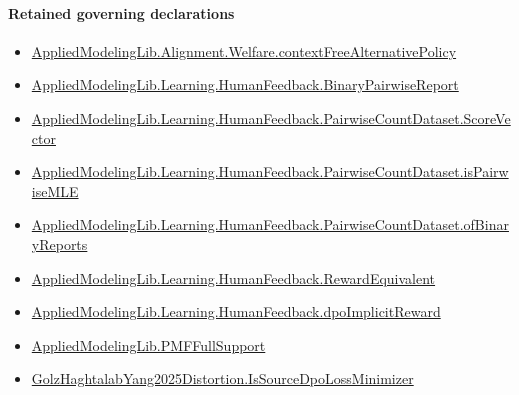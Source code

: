 \documentclass[10pt]{article}
\begin{document}
\paragraph{Retained governing declarations}
\begin{itemize}\raggedright
\item \hyperlink{governing-declaration-b7cf9e04e23161e5}{Applied\allowbreak{}Modeling\allowbreak{}Lib.\allowbreak{}Alignment.\allowbreak{}Welfare.\allowbreak{}context\allowbreak{}Free\allowbreak{}Alternative\allowbreak{}Policy}
\item \hyperlink{governing-declaration-bc3d6ca8e7e0ac9d}{Applied\allowbreak{}Modeling\allowbreak{}Lib.\allowbreak{}Learning.\allowbreak{}Human\allowbreak{}Feedback.\allowbreak{}Binary\allowbreak{}Pairwise\allowbreak{}Report}
\item \hyperlink{governing-declaration-87eda978eb1b0c9d}{Applied\allowbreak{}Modeling\allowbreak{}Lib.\allowbreak{}Learning.\allowbreak{}Human\allowbreak{}Feedback.\allowbreak{}Pairwise\allowbreak{}Count\allowbreak{}Dataset.\allowbreak{}Score\allowbreak{}Vector}
\item \hyperlink{governing-declaration-cba21d23e0e5aa10}{Applied\allowbreak{}Modeling\allowbreak{}Lib.\allowbreak{}Learning.\allowbreak{}Human\allowbreak{}Feedback.\allowbreak{}Pairwise\allowbreak{}Count\allowbreak{}Dataset.\allowbreak{}is\allowbreak{}Pairwise\allowbreak{}MLE}
\item \hyperlink{governing-declaration-449f87e91bf37ce0}{Applied\allowbreak{}Modeling\allowbreak{}Lib.\allowbreak{}Learning.\allowbreak{}Human\allowbreak{}Feedback.\allowbreak{}Pairwise\allowbreak{}Count\allowbreak{}Dataset.\allowbreak{}of\allowbreak{}Binary\allowbreak{}Reports}
\item \hyperlink{governing-declaration-16b50286b4cd31a4}{Applied\allowbreak{}Modeling\allowbreak{}Lib.\allowbreak{}Learning.\allowbreak{}Human\allowbreak{}Feedback.\allowbreak{}Reward\allowbreak{}Equivalent}
\item \hyperlink{governing-declaration-95571fb7643367ad}{Applied\allowbreak{}Modeling\allowbreak{}Lib.\allowbreak{}Learning.\allowbreak{}Human\allowbreak{}Feedback.\allowbreak{}dpo\allowbreak{}Implicit\allowbreak{}Reward}
\item \hyperlink{library-prerequisite-268c959ee7d2d148}{Applied\allowbreak{}Modeling\allowbreak{}Lib.\allowbreak{}PMF\allowbreak{}Full\allowbreak{}Support}
\item \hyperlink{governing-declaration-4cdae0c3705e3d00}{Golz\allowbreak{}Haghtalab\allowbreak{}Yang2025\allowbreak{}Distortion.\allowbreak{}Is\allowbreak{}Source\allowbreak{}Dpo\allowbreak{}Loss\allowbreak{}Minimizer}

\end{itemize}
\end{document}
